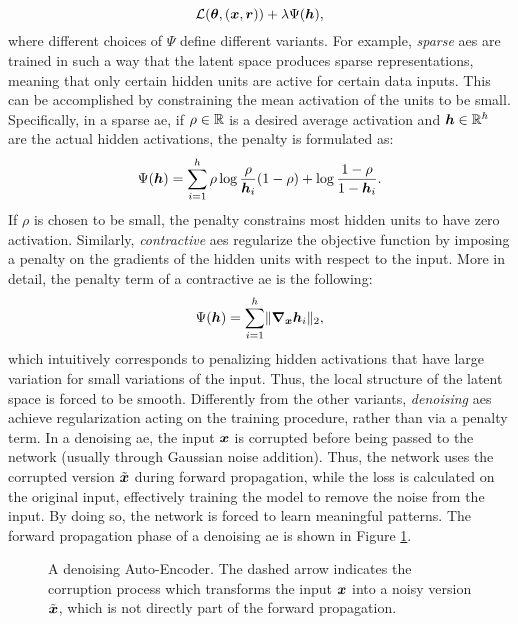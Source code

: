 $$\Loss(\Param, (\Vector{x}, \Vector{r})) + \lambda \Psi(\Vector{h}),$$
where different choices of $\Psi$ define different variants. For example, \emph{sparse} \glspl{ae}
are trained in such a way that the latent space produces sparse representations, meaning that only certain hidden units are active for certain data inputs. This can be accomplished by constraining the mean activation of the units to be small. Specifically, in a sparse \gls{ae}, if $\rho \in \mathbb{R}$ is a desired average activation and $\Vector{h} \in \Real^h$ are the actual hidden activations, the penalty is formulated as:
$$\Psi(\Vector{h}) = \sum_{i=1}^h \rho \log \frac{\rho}{\Vector{h}_i} (1 - \rho) + \log \frac{1-\rho}{1-\Vector{h}_i}.$$
If $\rho$ is chosen to be small, the penalty constrains most hidden units to have zero activation. Similarly, \emph{contractive} \glspl{ae} \citep{rifai2011contractiveautoenc} regularize the objective function by imposing a penalty on the gradients of the hidden units with respect to the input. More in detail, the penalty term of a contractive \gls{ae} is the following:
$$\Psi(\Vector{h}) = \sum_{i=1}^h\norm{\grad_{\Vector{x}}\Vector{h}_i}_2,$$
which intuitively corresponds to penalizing hidden activations that have large variation for small variations of the input. Thus, the local structure of the latent space is forced to be smooth. Differently from the other variants, \emph{denoising} \glspl{ae} \citep{vincent2010denoisingautoenc} achieve regularization acting on the training procedure, rather than via a penalty term. In a denoising \gls{ae}, the input $\Vector{x}$ is corrupted before being passed to the network (usually through Gaussian noise addition). Thus, the network uses the corrupted version $\tilde{\Vector{x}}$ during forward propagation, while the loss is calculated on the original input, effectively training the model to remove the noise from the input. By doing so, the network is forced to learn meaningful patterns. The forward propagation phase of a denoising \gls{ae} is shown in Figure \ref{fig:denoising-ae}.
\begin{figure*}[h!]
    \centering
    \resizebox{.6\textwidth}{!}{}
    \caption{A denoising Auto-Encoder. The dashed arrow indicates the corruption process which transforms the input $\Vector{x}$ into a noisy version $\tilde{\Vector{x}}$, which is not directly part of the forward propagation.}
    \label{fig:denoising-ae}
\end{figure*}

